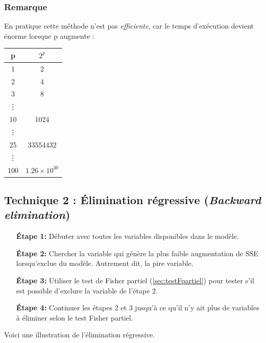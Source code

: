 \documentclass[11pt,french]{report}
\begin{document}
\subsubsection*{Remarque}
En pratique cette méthode n'est pas \emph{efficiente}, car le temps d'exécution devient énorme lorsque p augmente :

\begin{center}
\begin{tabular}{|c|c|}
\hline
\rowcolor{backcolour}
p & $2^p$ \\
\hline
1 & 2 \\
2 & 4 \\
3 & 8 \\
\vdots & \\
10 & 1024 \\
\vdots & \\
25 & 33554432 \\
\vdots & \\
100 & $1.26\times 10^{30}$ \\
\hline
\end{tabular}
\end{center}

\subsection{Technique 2 : Élimination régressive (\emph{Backward elimination})}
\label{tech2}

\begin{itemize}
\item [\textbf{Étape 1:}] Débuter avec toutes les variables disponibles dans le modèle.

\item [\textbf{Étape 2:}] Chercher la variable qui génère la plus faible augmentation de SSE lorsqu'exclue du modèle. Autrement dit, la pire variable.

\item [\textbf{Étape 3:}] Utiliser le test de Fisher partiel (\ref{sec:testFpartiel}) pour tester s'il est possible d'exclure la variable de l'étape 2.

\item [\textbf{Étape 4:}] Continuer les étapes 2 et 3 jusqu'à ce qu'il n'y ait plus de variables à éliminer selon le test Fisher partiel.
\end{itemize}
\bigskip

Voici une illustration de l'élimination régressive.
\end{document}

